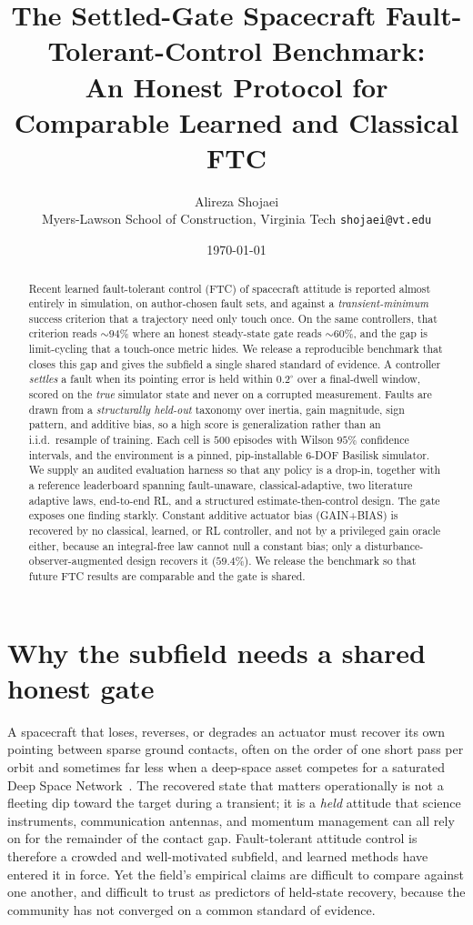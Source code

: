 \documentclass[11pt]{article}
\title{\textbf{The Settled-Gate Spacecraft Fault-Tolerant-Control Benchmark:\\
An Honest Protocol for Comparable Learned and Classical FTC}}
\author{Alireza Shojaei\\ \small Myers-Lawson School of Construction, Virginia Tech \quad \texttt{shojaei@vt.edu}}
\date{\today}
\begin{document}
\maketitle

\begin{abstract}
Recent learned fault-tolerant control (FTC) of spacecraft attitude is reported almost entirely in
simulation, on author-chosen fault sets, and against a \emph{transient-minimum} success criterion
that a trajectory need only touch once. On the same controllers, that criterion reads $\sim$$94\%$
where an honest steady-state gate reads $\sim$$60\%$, and the gap is limit-cycling that a touch-once
metric hides. We release a reproducible benchmark that closes this gap and gives the subfield a
single shared standard of evidence. A controller \emph{settles} a fault when its pointing error is
held within $0.2^\circ$ over a final-dwell window, scored on the \emph{true} simulator state and
never on a corrupted measurement. Faults are drawn from a \emph{structurally held-out} taxonomy over
inertia, gain magnitude, sign pattern, and additive bias, so a high score is generalization rather
than an i.i.d.\ resample of training. Each cell is $500$ episodes with Wilson $95\%$ confidence
intervals, and the environment is a pinned, pip-installable 6-DOF Basilisk simulator. We supply an
audited evaluation harness so that any policy is a drop-in, together with a reference leaderboard
spanning fault-unaware, classical-adaptive, two literature adaptive laws, end-to-end RL, and a
structured estimate-then-control design. The gate exposes one finding starkly. Constant additive
actuator bias (GAIN+BIAS) is recovered by no classical, learned, or RL controller, and not by a
privileged gain oracle either, because an integral-free law cannot null a constant bias; only a
disturbance-observer-augmented design recovers it ($59.4\%$). We release the benchmark so that future
FTC results are comparable and the gate is shared.
\end{abstract}

\section{Why the subfield needs a shared honest gate}
A spacecraft that loses, reverses, or degrades an actuator must recover its own pointing between
sparse ground contacts, often on the order of one short pass per orbit and sometimes far less when a
deep-space asset competes for a saturated Deep Space Network~\cite{OIG2023DSN}. The recovered state
that matters operationally is not a fleeting dip toward the target during a transient; it is a
\emph{held} attitude that science instruments, communication antennas, and momentum management can
all rely on for the remainder of the contact gap. Fault-tolerant attitude control is therefore a
crowded and well-motivated subfield, and learned methods have entered it in force. Yet the field's
empirical claims are difficult to compare against one another, and difficult to trust as predictors
of held-state recovery, because the community has not converged on a common standard of evidence.
\end{document}
